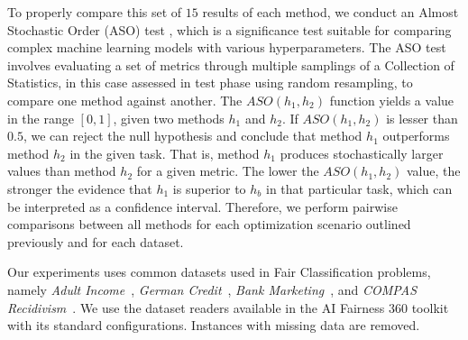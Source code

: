 To properly compare this set of $15$ results of each method, we conduct an Almost Stochastic Order (ASO) test \citep{dror2019deep}, which is a significance test suitable for comparing complex machine learning models with various hyperparameters. The ASO test involves evaluating a set of metrics through multiple samplings of a Collection of Statistics, in this case assessed in test phase using random resampling, to compare one method against another. The $ASO(h_1, h_2)$ function yields a value in the range $[0, 1]$, given two methods $h_1$ and $h_2$. If $ASO(h_1, h_2)$ is lesser than $0.5$, we can reject the null hypothesis and conclude that method $h_1$ outperforms method $h_2$ in the given task. That is, method $h_1$ produces stochastically larger values than method $h_2$ for a given metric. The lower the $ASO(h_1, h_2)$ value, the stronger the evidence that $h_1$ is superior to $h_b$ in that particular task, which can be interpreted as a confidence interval. Therefore, we perform pairwise comparisons between all methods for each optimization scenario outlined previously and for each dataset.


Our experiments uses common datasets used in Fair Classification problems, namely \textit{Adult Income}~\citep{misc_adult_2}, \textit{German Credit}~\citep{misc_statlog_(german_credit_data)_144}, \textit{Bank Marketing}~\citep{misc_bank_marketing_222}, and \textit{COMPAS Recidivism}~\citep{misc_compas}. We use the dataset readers available in the AI Fairness 360 toolkit~\citep{aif360-oct-2018} with its standard configurations. Instances with missing data are removed.

